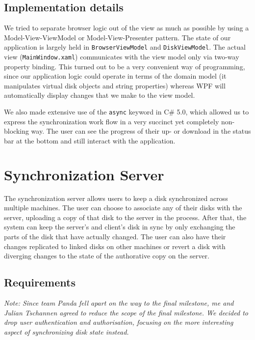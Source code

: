 \documentclass[a4paper,12pt]{article}
\newcommand{\groupname}{Panda\xspace}
\begin{document}
\subsection{Implementation details}
We tried to separate browser logic out of the view as much as possible by using a Model-View-ViewModel or Model-View-Presenter pattern. The state of our application is largely held in \lstinline!BrowserViewModel! and \lstinline!DiskViewModel!.
The actual view (\lstinline!MainWindow.xaml!) communicates with the view model only via two-way property binding.
This turned out to be a very convenient way of programming, since our application logic could operate in terms of the domain model (it manipulates virtual disk objects and string properties) whereas WPF will automatically display changes that we make to the view model.

We also made extensive use of the \lstinline!async! keyword in C\# 5.0, which allowed us to express the synchronization work flow in a very succinct yet completely non-blocking way. 
The user can see the progress of their up- or download in the status bar at the bottom and still interact with the application.


\section{Synchronization Server}
The synchronization server allows users to keep a disk synchronized across multiple machines. 
The user can choose to associate any of their disks with the server, uploading a copy of that disk to the server in the process. After that, the system can keep the server's and client's disk in sync by only exchanging the parts of the disk that have actually changed. 
The user can also have their changes replicated to linked disks on other machines or revert a disk with diverging changes to the state of the authorative copy on the server.

\subsection{Requirements}
\emph{Note: Since team \groupname fell apart on the way to the final milestone, me and Julian Tschannen agreed to reduce the scope of the final milestone. We decided to drop user authentication and authorisation, focusing on the more interesting aspect of synchronizing disk state instead.}
\end{document}
